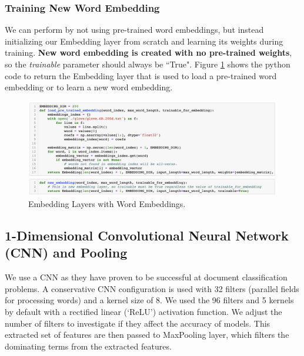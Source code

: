 \documentclass[11pt]{article}
\begin{document}
\subsubsection{Training New Word Embedding}

We can perform by not using pre-trained word embeddings, but instead initializing our Embedding layer from scratch and learning its weights during training. 
%
\textbf{New word embedding is created with no pre-trained weights}, so the \textit{trainable} parameter should always be ``True".
Figure \ref{fig:word_embedding_code} shows the python code to return the Embedding layer that is used 
to load a pre-trained word embedding or 
to learn a new word embedding.
 
\begin{figure}[h!]
\centering 
\includegraphics[width=\textwidth]{word_embedding_code.png}
\caption{Embedding Layers with Word Embeddings.}
  \label{fig:word_embedding_code}
\end{figure}


\subsection{1-Dimensional Convolutional Neural Network (CNN) and Pooling}

We use a CNN as they have proven to be successful at document classification problems.
A conservative CNN configuration is used with 32 filters (parallel fields for processing words) and a kernel size of 8.
We used the 96 filters and 5 kernels by default
with a rectified linear (`ReLU') activation function.
%
We adjust the number of filters to investigate if they affect the accuracy of models.
%
This extracted set of features are then passed to MaxPooling layer, which filters the dominating terms from the extracted features.
\end{document}
